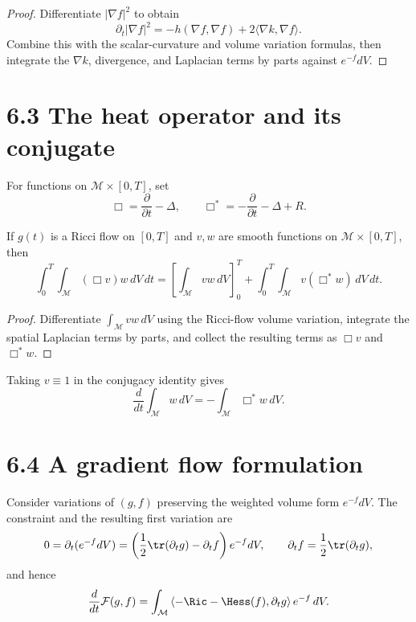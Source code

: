 \begin{proof}
\sketch Differentiate $|\nabla f|^2$ to obtain
\[
\partial_t|\nabla f|^2=-h(\nabla f,\nabla f)+2\langle\nabla k,\nabla f\rangle.
\]
Combine this with the scalar-curvature and volume variation formulas, then
integrate the $\nabla k$, divergence, and Laplacian terms by parts against
$e^{-f}dV$.
\end{proof}

\section{6.3 \quad The heat operator and its conjugate}

For functions on $\mathcal M\times[0,T]$, set
\[
\Box=\frac{\partial}{\partial t}-\Delta,
\qquad
\Box^*=-\frac{\partial}{\partial t}-\Delta+R.
\]

\begin{proposition}
\label{topping-gradient-flow-conjugate-heat-operator}
If $g(t)$ is a Ricci flow on $[0,T]$ and $v,w$ are smooth functions on
$\mathcal M\times[0,T]$, then
\[
\int_0^T\!\int_{\mathcal M}(\Box v)w\,dV\,dt
=\left[\int_{\mathcal M}vw\,dV\right]_0^T
+\int_0^T\!\int_{\mathcal M}v(\Box^*w)\,dV\,dt.
\]
\end{proposition}

\begin{proof}
\sketch Differentiate $\int_{\mathcal M}vw\,dV$ using the Ricci-flow
volume variation, integrate the spatial Laplacian terms by parts, and collect
the resulting terms as $\Box v$ and $\Box^*w$.
\end{proof}

\begin{remark}
\label{topping-gradient-flow-conjugate-heat-special-case}
Taking $v\equiv1$ in the conjugacy identity gives
\[
\frac{d}{dt}\int_{\mathcal M}w\,dV=-\int_{\mathcal M}\Box^*w\,dV.
\]
\end{remark}

\section{6.4 \quad A gradient flow formulation}

Consider variations of $(g,f)$ preserving the weighted volume form
$e^{-f}dV$. The constraint and the resulting first variation are
\[
0=\partial_t(e^{-f}dV)=\left(\frac12\tr(\partial_tg)-\partial_tf\right)e^{-f}dV,
\qquad
\partial_tf=\frac12\tr(\partial_tg),
\]
and hence
\[
\frac{d}{dt}\mathcal F(g,f)=
\int_{\mathcal M}\left\langle-\Ric-\Hess(f),\partial_tg\right\rangle e^{-f}\,dV.
\]

